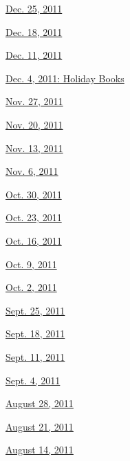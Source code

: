 \href{http://www.nytimes.com/indexes/2011/12/25/books/review/index.html}{Dec.
25, 2011}

\href{http://www.nytimes.com/indexes/2011/12/18/books/review/index.html}{Dec.
18, 2011}

\href{http://www.nytimes.com/indexes/2011/12/11/books/review/index.html}{Dec.
11, 2011}

\href{http://www.nytimes.com/indexes/2011/12/04/books/review/index.html}{Dec.
4, 2011: Holiday Books}

\href{http://www.nytimes.com/indexes/2011/11/27/books/review/index.html}{Nov.
27, 2011}

\href{http://www.nytimes.com/indexes/2011/11/20/books/review/index.html}{Nov.
20, 2011}

\href{http://www.nytimes.com/indexes/2011/11/13/books/review/index.html}{Nov.
13, 2011}

\href{http://www.nytimes.com/indexes/2011/11/05/books/review/index.html}{Nov.
6, 2011}

\href{http://www.nytimes.com/indexes/2011/10/28/books/review/index.html}{Oct.
30, 2011}

\href{http://www.nytimes.com/indexes/2011/10/21/books/review/index.html}{Oct.
23, 2011}

\href{http://www.nytimes.com/indexes/2011/10/14/books/review/index.html}{Oct.
16, 2011}

\href{http://www.nytimes.com/indexes/2011/10/07/books/review/index.html}{Oct.
9, 2011}

\href{http://www.nytimes.com/indexes/2011/09/30/books/review/index.html}{Oct.
2, 2011}

\href{http://www.nytimes.com/indexes/2011/09/23/books/review/index.html}{Sept.
25, 2011}

\href{http://www.nytimes.com/indexes/2011/09/16/books/review/index.html}{Sept.
18, 2011}

\href{http://www.nytimes.com/indexes/2011/09/09/books/review/index.html}{Sept.
11, 2011}

\href{http://www.nytimes.com/indexes/2011/09/02/books/review/index.html}{Sept.
4, 2011}

\href{http://www.nytimes.com/indexes/2011/08/26/books/review/index.html}{August
28, 2011}

\href{http://www.nytimes.com/indexes/2011/08/19/books/review/index.html}{August
21, 2011}

\href{http://www.nytimes.com/indexes/2011/08/13/books/review/index.html}{August
14, 2011}

